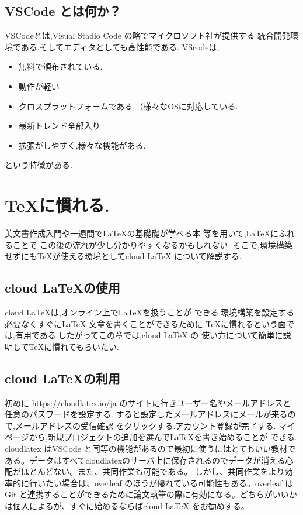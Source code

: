 \documentclass{ltjsarticle}
\begin{document}
\subsection{VSCode とは何か？}
VSCodeとは,Visual Stadio Code の略でマイクロソフト社が提供する
統合開発環境である.そしてエディタとしても高性能である.
VScodeは,
\begin{itemize}
  \item 無料で頒布されている.
  \item 動作が軽い
  \item クロスプラットフォームである.（様々なOSに対応している.
  \item 最新トレンド全部入り
  \item 拡張がしやすく,様々な機能がある.
\end{itemize}
という特徴がある.
\section{\TeX に慣れる.}
美文書作成入門\cite{美文書本}や一週間で\LaTeX の基礎礎が学べる本
\cite{一週間基礎}等を用いて,\LaTeX にふれることで
この後の流れが少し分かりやすくなるかもしれない.
そこで,環境構築せずにも\TeX が使える環境としてcloud \LaTeX 
について解説する.
\subsection{cloud \LaTeX の使用}
cloud \LaTeX は,オンライン上で\LaTeX を扱うことが
できる.環境構築を設定する必要なくすぐにLaTeX 文章を書くことができるために
TeXに慣れるという面では,有用である.したがってこの章では,cloud LaTeX の
使い方について簡単に説明して\TeX に慣れてもらいたい.
\subsection{cloud \LaTeX の利用}
初めに
\url{https://cloudlatex.io/ja}
のサイトに行きユーザー名やメールアドレスと任意のパスワードを設定する.
すると設定したメールアドレスにメールが来るので,メールアドレスの受信確認
をクリックする.アカウント登録が完了する.
マイページから,新規プロジェクトの追加を選んで\LaTeX を書き始めることが
できる.
cloudlatex はVSCode と同等の機能があるので最初に使うにはとてもいい教材である。データはすべてcloudlatexのサーバ上に保存されるのでデータが消える心配がほとんどない。また、共同作業も可能である。
しかし、共同作業をより効率的に行いたい場合は、overleaf のほうが優れている可能性もある。overleaf はGit と連携することができるために論文執筆の際に有効になる。どちらがいいかは個人によるが、すぐに始めるならばcloud LaTeX をお勧めする。
\end{document}
